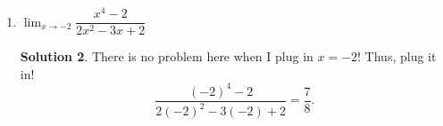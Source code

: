 \documentclass[10pt]{article}
\newcommand{\ds}{\displaystyle}
\theoremstyle{Theorem}
\theoremstyle{definition}
\newtheorem*{solution}{Solution}
\theoremstyle{remark}
\theoremstyle{custom}
\begin{document}
\begin{enumerate}[1.]
\begin{solution}
The issue lies with the $x$ in the denominator. Notice we cannot factor nor get a common denominator. The square root here is the key hint. This means we should use the conjugate! This is what that looks like.
$$\dfrac{(\sqrt{9+x}-3)(\sqrt{9+x}+3)}{x(\sqrt{9+x}+3)}=\dfrac{9+x-9}{x(\sqrt{9+x}+3)}=\dfrac{x}{x(\sqrt{9+x}+3)}=\dfrac{1}{\sqrt{9+x}+3}.$$
Notice our $x$ problem is gone! Now we can plug in.
$$\dfrac{1}{\sqrt{9+0}+3}=\dfrac{1}{6}.$$
\end{solution}
\newpage
\item $\ds\lim_{x\rightarrow -2} \dfrac{x^4-2}{2x^2-3x+2}$

\begin{solution}
There is no problem here when I plug in $x=-2$! Thus, plug it in!
$$\dfrac{(-2)^4-2}{2(-2)^2-3(-2)+2}=\dfrac{7}{8}.$$
\end{solution}
\end{enumerate}
\end{document}

